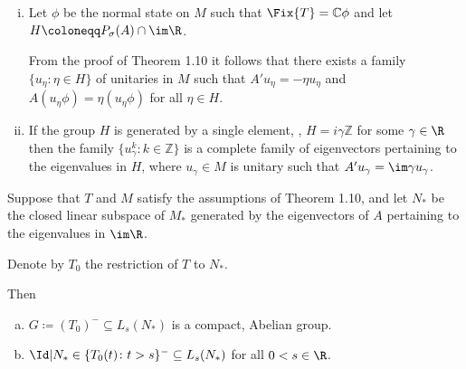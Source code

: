 \newpage

\begin{remarks}\label{rem:d3-1.12}
\begin{enumerate}[(i)]

\item 
Let $\phi$ be the normal state on $M$ such that $\Fix{T} = \mathbb{C}\phi$ and let $H \coloneqq P_{\sigma}(A) \cap \im\R$.

From the proof of Theorem 1.10 it follows that there exists a family $\{u_{\eta} \colon \eta \in H\}$ of unitaries in $M$ such that $A'u_{\eta} = -\eta u_{\eta}$ and $A(u_{\eta}\phi) = \eta(u_{\eta}\phi)$ for all $\eta \in H$.

\item 
If the group $H$ is generated by a single element, \ie, $H = i\gamma\mathbb{Z}$ for some $\gamma \in \R$ then the family $\{u_{\gamma}^{k} \colon k \in \mathbb{Z}\}$ is a complete family of eigenvectors pertaining to the eigenvalues in $H$, where $u_{\gamma} \in M$ is unitary such that $A'u_{\gamma} = \im\gamma u_{\gamma}$.

\end{enumerate}
\end{remarks}
\begin{proposition}\label{prop:d3-1.13}
Suppose that $T$ and $M$ satisfy the assumptions of Theorem 1.10, and let $N_{*}$ be the closed linear subspace of $M_{*}$ generated by the eigenvectors of $A$ pertaining to the eigenvalues in $\im\R$.

Denote by $T_{0}$ the restriction of $T$ to $N_{*}$.

Then
\begin{enumerate}[(a)]
\item $G \coloneqq (T_{0})^{-} \subseteq L_{s}(N_{*})$ is a compact, Abelian group.

\item $\Id|N_{*}\in\{T_{0}(t) \colon t>s\}^{-} \subseteq L_{s}(N_{*})$ for all $0<s \in \R$.
\end{enumerate}
\end{proposition}

